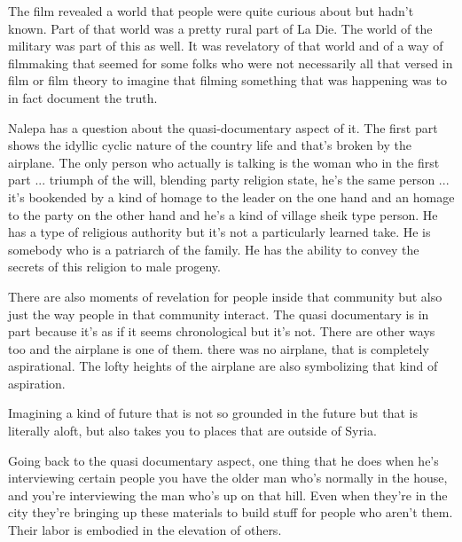\documentclass{article}
\begin{document}
\vspace{5mm}

The film revealed a world that people were quite curious about but hadn't known.  Part of that world was a pretty rural part of La Die.  The world of the military was part of this as well.  It was revelatory of that world and of a way of filmmaking that seemed for some folks who were not necessarily all that versed in film or film theory to imagine that filming something that was happening was to in fact document the truth.  

\vspace{5mm}

Nalepa has a question about the quasi-documentary aspect of it.  The first part shows the idyllic cyclic nature of the country life and that's broken by the airplane.  The only person who actually is talking is the woman who in the first part ... triumph of the will, blending party religion state, he's the same person ... it's bookended by a kind of homage to the leader on the one hand and an homage to the party on the other hand and he's a kind of village sheik type person.  He has a type of religious authority but it's not a particularly learned take.  He is somebody who is a patriarch of the family.  He has the ability to convey the secrets of this religion to male progeny.  

\vspace{5mm}

There are also moments of revelation for people inside that community but also just the way people in that community interact.  The quasi documentary is in part because it's as if it seems chronological but it's not.  There are other ways too and the airplane is one of them.  there was no airplane, that is completely aspirational.  The lofty heights of the airplane are also symbolizing that kind of aspiration.  

\vspace{5mm}

Imagining a kind of future that is not so grounded in the future but that is literally aloft, but also takes you to places that are outside of Syria.  

\vspace{5mm}

Going back to the quasi documentary aspect, one thing that he does when he's interviewing certain people you have the older man who's normally in the house, and you're interviewing the man who's up on that hill.  Even when they're in the city they're bringing up these materials to build stuff for people who aren't them.  Their labor is embodied in the elevation of others.  
\end{document}
